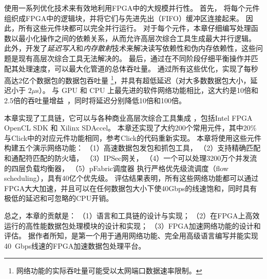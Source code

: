 \name{} 使用一系列优化技术来有效地利用FPGA中的大规模并行性。
首先，\name{} 将每个元件组织成FPGA中的逻辑块，并将它们与先进先出（FIFO）缓冲区连接起来。
因此，所有这些元件块都可以完全并行运行。
对于每个元件，本章仔细编写处理函数以最小化操作之间的依赖关系，从而允许高层次综合工具生成最大并行逻辑。
此外，开发了\textit {延迟写入}和\textit {内存散射}技术来解决读写依赖性和伪内存依赖性，这些问题是现有高层次综合工具无法解决的。
最后，通过在不同阶段仔细平衡操作并匹配其处理速度，可以最大化管道的总体吞吐量。
通过所有这些优化，\name{}实现了每秒高达2亿个数据包的数据包吞吐量 \footnote {\name{} 网络功能的实际吞吐量可能受以太网端口数据速率限制。}，并具有超低延迟（对大多数数据包大小，延迟小于 $2 \mu$s）。
与 GPU 和 CPU 上最先进的软件网络功能相比，这大约是10倍和2.5倍的吞吐量增益~\cite {packetshader}，同时将延迟分别降低10倍和100倍。

本章实现了\name 工具链，它可以与各种商业高层次综合工具集成 \cite {vivado,aoc}，包括Intel FPGA OpenCL SDK 和 Xilinx SDAccel。
本章还实现了大约200个常用元件，其中20\%与Click中的对应元件功能相同，参考Click的代码重新实现。
本章将使用这些元件构建五个演示网络功能：
（1）高速数据包发包和抓包工具，
（2）支持精确匹配和通配符匹配的防火墙，
（3）IPSec网关，
（4）一个可以处理3200万个并发流的四层负载均衡器，
（5）pFabric调度器 \cite {pfabric} 执行严格优先级流调度（flow scheduling），具有40亿个优先级。
评估结果表明，所有这些网络功能都可以通过FPGA大大加速，并且可以在任何数据包大小下使40Gbps的线速饱和，同时具有极低的延迟和可忽略的CPU开销。

总之，本章的贡献是：
（1）\name 语言和工具链的设计与实现；
（2）在FPGA上高效运行的高性能数据包处理模块的设计和实现；
（3）FPGA加速网络功能的设计和评估。
据作者所知，\name 是第一个用于通用网络功能、完全用高级语言编写并能实现40~Gbps线速的FPGA加速数据包处理平台。


